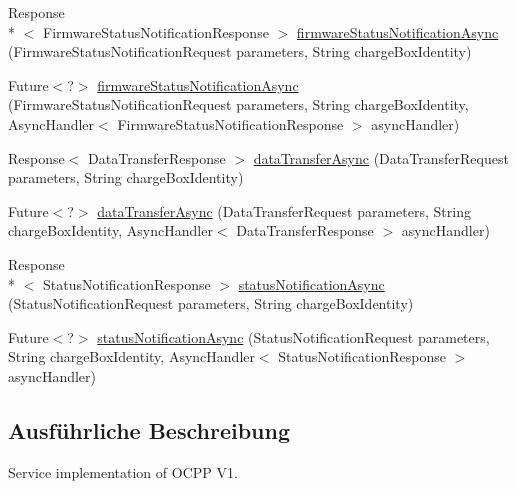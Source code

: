 \begin{DoxyCompactItemize}
\item 
Response\\*
$<$ Firmware\-Status\-Notification\-Response $>$ \hyperlink{classde_1_1rwth_1_1idsg_1_1steve_1_1ocpp_1_1soap_1_1_central_system_service15___soap_server_a3ee5bf06a048acb1fd2952609d61db68}{firmware\-Status\-Notification\-Async} (Firmware\-Status\-Notification\-Request parameters, String charge\-Box\-Identity)
\item 
Future$<$?$>$ \hyperlink{classde_1_1rwth_1_1idsg_1_1steve_1_1ocpp_1_1soap_1_1_central_system_service15___soap_server_a681fdb8008997e6f4d5d7528c1f3d635}{firmware\-Status\-Notification\-Async} (Firmware\-Status\-Notification\-Request parameters, String charge\-Box\-Identity, Async\-Handler$<$ Firmware\-Status\-Notification\-Response $>$ async\-Handler)
\item 
Response$<$ Data\-Transfer\-Response $>$ \hyperlink{classde_1_1rwth_1_1idsg_1_1steve_1_1ocpp_1_1soap_1_1_central_system_service15___soap_server_ade930a8b8937d2d78902322f9535f549}{data\-Transfer\-Async} (Data\-Transfer\-Request parameters, String charge\-Box\-Identity)
\item 
Future$<$?$>$ \hyperlink{classde_1_1rwth_1_1idsg_1_1steve_1_1ocpp_1_1soap_1_1_central_system_service15___soap_server_ad9ad0c7d7b917a9510d41faead2d9add}{data\-Transfer\-Async} (Data\-Transfer\-Request parameters, String charge\-Box\-Identity, Async\-Handler$<$ Data\-Transfer\-Response $>$ async\-Handler)
\item 
Response\\*
$<$ Status\-Notification\-Response $>$ \hyperlink{classde_1_1rwth_1_1idsg_1_1steve_1_1ocpp_1_1soap_1_1_central_system_service15___soap_server_a6d9cc98869b7b0865750367985002872}{status\-Notification\-Async} (Status\-Notification\-Request parameters, String charge\-Box\-Identity)
\item 
Future$<$?$>$ \hyperlink{classde_1_1rwth_1_1idsg_1_1steve_1_1ocpp_1_1soap_1_1_central_system_service15___soap_server_a366d1acac7c6401705bf75385a3f03cf}{status\-Notification\-Async} (Status\-Notification\-Request parameters, String charge\-Box\-Identity, Async\-Handler$<$ Status\-Notification\-Response $>$ async\-Handler)
\end{DoxyCompactItemize}


\subsection{Ausführliche Beschreibung}
Service implementation of O\-C\-P\-P V1.

